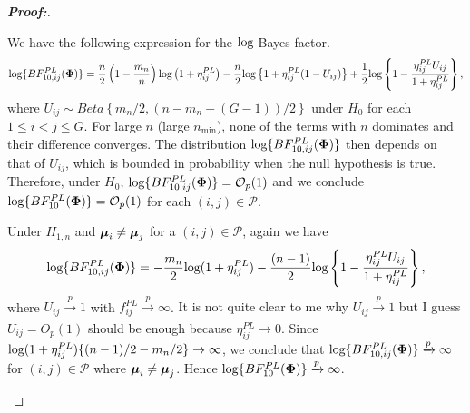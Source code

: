 \documentclass[times,sort&compress,3p]{elsarticle}
\theoremstyle{plain}%
\theoremstyle{definition}
\def\log{\hbox{log}}
\def\log{\hbox{log}}
\def\be{\begin{eqnarray}}
\def\ee{\end{eqnarray}}
\newcommand{\umu}               {\mbox{\boldmath$\mu$}}
\newcommand{\uPhi}              {\mbox{\boldmath$\Phi$}}
\begin{document}
\begin{proof}[\textbf{\upshape Proof:}]
\begin{description}
We have the following expression for the $\log$ Bayes factor. 
\be
 \log\{BF^{PL}_{10,ij}(\uPhi)\} =\frac{n}{2}\left( 1 - \frac{m_n}{n}\right)\log\left(1 + \eta^{PL}_{ij} \right) - \frac{n}{2}\log\left\{ 1 + \eta^{PL}_{ij}(1-U_{ij}) \right \} +\frac{1}{2}\log \left\{1 - \frac{\eta^{PL}_{ij} U_{ij}}{1+\eta^{PL}_{ij}}\right\},  \nonumber
\ee
where $U_{ij} \sim Beta\left\{ m_n/2,  (n - m_n -(G-1))/2 \right\}$ under $H_0$ for each $1 \leq i < j \leq G$.
For large $n$ (large $n_{\min}$), none of the terms with $n$ dominates and their difference converges.
The distribution $ \log\{BF^{PL}_{10, ij}(\uPhi) \}$ then depends on that of $U_{ij}$, which is bounded in probability when the null hypothesis is true.
Therefore, under $H_0$, $\log\{BF^{PL}_{10, ij}(\uPhi) \} = \mathcal{O}_{p}(1)$ and we conclude $\log\{BF^{PL}_{10}(\uPhi) \} = \mathcal{O}_{p}(1)$ for each $(i,j) \in \mathcal{P}$.

Under $H_{1,n}$ and $\umu_i \neq \umu_j$ for a $(i,j) \in \mathcal{P}$, again we have
\be
\log\{BF^{PL}_{10,ij}(\uPhi) \} = -\frac{m_n}{2}\log(1 + \eta^{PL}_{ij}) - \frac{(n-1)}{2}\log\left\{ 1 - \frac{\eta^{PL}_{ij} U_{ij}}{1 + \eta^{PL}_{ij}} \right\}, \nonumber
\ee
where $U_{ij} \xrightarrow[]{p} 1$ with $f^{PL}_{ij}\xrightarrow[]{p} \infty$.
{\color{blue}It is not quite clear to me why $U_{ij} \overset{p}{\to} 1$ but I guess $U_{ij} = O_p(1)$ should be enough because $\eta_{ij}^{PL}\to 0$. }
Since $\log(1 + \eta^{PL}_{ij})\{ (n-1)/2 - m_n/2\} \rightarrow \infty$, we conclude that $\log\{BF^{PL}_{10,ij}(\uPhi) \} \xrightarrow[]{p} \infty $ for $(i,j) \in \mathcal{P}$ where $\umu_i \neq \umu_j$. Hence $\log\{BF^{PL}_{10}(\uPhi) \} \xrightarrow[]{p} \infty $.
\end{description}
\end{proof}
\end{document}
